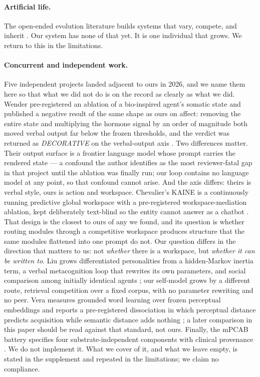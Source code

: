 \documentclass[11pt]{article}
\begin{document}
\paragraph{Artificial life.} The open-ended evolution literature builds systems that vary, compete, and inherit \cite{plantec2025,horiguchi2026}. Our system has none of that yet. It is one individual that grows. We return to this in the limitations.

\paragraph{Concurrent and independent work.} Five independent projects landed adjacent to ours in 2026, and we name them here so that what we did not do is on the record as clearly as what we did. Wender pre-registered an ablation of a bio-inspired agent's somatic state and published a negative result of the same shape as ours on affect: removing the entire state and multiplying the hormone signal by an order of magnitude both moved verbal output far below the frozen thresholds, and the verdict was returned as \emph{DECORATIVE} on the verbal-output axis \cite{wender2026}. Two differences matter. Their output surface is a frontier language model whose prompt carries the rendered state --- a confound the author identifies as the most reviewer-fatal gap in that project until the ablation was finally run; our loop contains no language model at any point, so that confound cannot arise. And the axis differs: theirs is verbal style, ours is action and workspace. Chevalier's KAINE is a continuously running predictive global workspace with a pre-registered workspace-mediation ablation, kept deliberately text-blind so the entity cannot answer as a chatbot \cite{chevalier2026}. That design is the closest to ours of any we found, and its question is whether routing modules through a competitive workspace produces structure that the same modules flattened into one prompt do not. Our question differs in the direction that matters to us: not \emph{whether} there is a workspace, but \emph{whether it can be written to}. Liu grows differentiated personalities from a hidden-Markov inertia term, a verbal metacognition loop that rewrites its own parameters, and social comparison among initially identical agents \cite{liu2026}; our self-model grows by a different route, retrieval competition over a fixed corpus, with no parameter rewriting and no peer. Vera measures grounded word learning over frozen perceptual embeddings and reports a pre-registered dissociation in which perceptual distance predicts acquisition while semantic distance adds nothing \cite{vera2026}; a later comparison in this paper should be read against that standard, not ours. Finally, the mPCAB battery specifies four substrate-independent components with clinical provenance \cite{niazi2026}. We do not implement it. What we cover of it, and what we leave empty, is stated in the supplement and repeated in the limitations; we claim no compliance.
\end{document}
